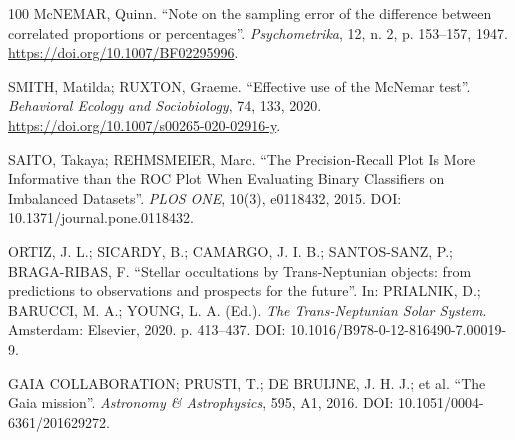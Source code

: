 \documentclass[msc]{on} %
\begin{document}
\begin{thebibliography}{100}
McNEMAR, Quinn. ``Note on the sampling error of the difference between correlated proportions or percentages''. \emph{Psychometrika}, 12, n. 2, p. 153--157, 1947. \url{https://doi.org/10.1007/BF02295996}.

SMITH, Matilda; RUXTON, Graeme. ``Effective use of the McNemar test''. \emph{Behavioral Ecology and Sociobiology}, 74, 133, 2020. \url{https://doi.org/10.1007/s00265-020-02916-y}.
%



 SAITO, Takaya; REHMSMEIER, Marc. ``The Precision-Recall Plot Is More Informative than the ROC Plot When Evaluating Binary Classifiers on Imbalanced Datasets''. \emph{PLOS ONE}, 10(3), e0118432, 2015. DOI: 10.1371/journal.pone.0118432.

 ORTIZ, J. L.; SICARDY, B.; CAMARGO, J. I. B.; SANTOS-SANZ, P.; BRAGA-RIBAS, F. ``Stellar occultations by Trans-Neptunian objects: from predictions to observations and prospects for the future''. In: PRIALNIK, D.; BARUCCI, M. A.; YOUNG, L. A. (Ed.). \emph{The Trans-Neptunian Solar System}. Amsterdam: Elsevier, 2020. p. 413--437. DOI: 10.1016/B978-0-12-816490-7.00019-9.

 GAIA COLLABORATION; PRUSTI, T.; DE BRUIJNE, J. H. J.; et al. ``The Gaia mission''. \emph{Astronomy \& Astrophysics}, 595, A1, 2016. DOI: 10.1051/0004-6361/201629272.


\end{thebibliography}
\end{document}
